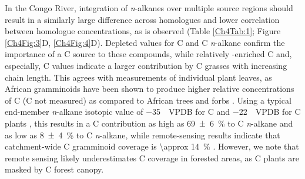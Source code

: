 In the Congo River, integration of \textit{n}-alkanes over multiple source regions should result in a similarly large  difference across homologues and lower correlation between homologue concentrations, as is observed (Table \ref{Ch4Tab:1}; Figure \ref{Ch4Fig:3}D, \ref{Ch4Fig:4}D). Depleted  values for C and C \textit{n}-alkane confirm the importance of a C source to these compounds, while relatively -enriched C and, especially, C values indicate a larger contribution by C grasses with increasing chain length. This agrees with measurements of individual plant leaves, as African gramminoids have been shown to produce higher relative concentrations of C (C not measured) as compared to African trees and forbs \citep{Rommerskirchen:2006gr,Vogts:2009fb}. Using a typical end-member \textit{n}-alkane isotopic value of \SI{-35}{\permil.VPDB} for C and \SI{-22}{\permil.VPDB} for C plants \citep[\textit{e.g.}][]{Castaneda:2011jb}, this results in a C contribution as high as \SI{69 \pm 6}{\%} to C \textit{n}-alkane and as low as \SI{8 \pm 4}{\%} to C \textit{n}-alkane, while remote-sensing results indicate that catchment-wide C gramminoid coverage is \SI{\approx 14}{\%} \citep[Figure \ref{Ch4Fig:1}B;][]{Still:2010wh}. However, we note that remote sensing likely underestimates C coverage in forested areas, as C plants are masked by C forest canopy.

